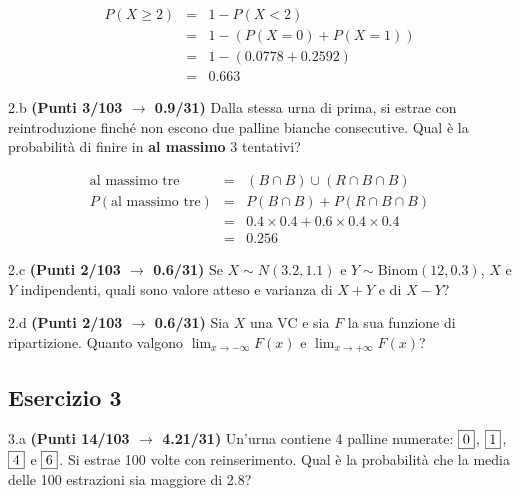 \documentclass[
  11pt,
]{book}
\theoremstyle{mytheoremstyle}
\theoremstyle{mydefstyle}
\newenvironment{sol}
  {
  \begin{tcolorbox}[enhanced,breakable,arc=0.1mm,boxrule=1pt,colback=white,colframe=iblue,
  title=\bf \fontfamily{lmss}\selectfont \hspace{.5 cm} Soluzione,drop fuzzy shadow]

}{
\end{tcolorbox}
  }
\begin{document}
\begin{sol}
\begin{eqnarray*}
  P(X\ge 2) &=&  1-P(X<2)\\
  &=& 1-(P(X=0)+P(X=1))\\
  &=& 1-(0.0778+0.2592)\\
  &=& 0.663
\end{eqnarray*}

\end{sol}

2.b \textbf{(Punti 3/103 \(\rightarrow\) 0.9/31)} Dalla stessa urna di prima, si estrae con reintroduzione finché non escono due palline bianche consecutive. Qual è la probabilità di finire in \textbf{al massimo} 3 tentativi?

\begin{sol}
\begin{eqnarray*}
  \text{al massimo tre} &=& (B\cap B)\cup(R\cap B\cap B )\\
  P(\text{al massimo tre}) &=& P(B\cap B)+P(R\cap B\cap B)\\
  &=&0.4\times 0.4 +0.6\times 0.4\times 0.4\\
  &=& 0.256
\end{eqnarray*}

\end{sol}

2.c \textbf{(Punti 2/103 \(\rightarrow\) 0.6/31)} Se \(X\sim N(3.2,1.1)\) e \(Y\sim\text{Binom}(12,0.3)\), \(X\) e \(Y\) indipendenti, quali sono valore atteso e varianza di \(X+Y\) e di \(X-Y\)?

2.d \textbf{(Punti 2/103 \(\rightarrow\) 0.6/31)} Sia \(X\) una VC e sia \(F\) la sua funzione di ripartizione. Quanto valgono \(\lim_{x\to-\infty}F(x)\) e \(\lim_{x\to+\infty}F(x)\)?

\subsection{Esercizio 3}\label{esercizio-3-21}

3.a \textbf{(Punti 14/103 \(\rightarrow\) 4.21/31)} Un'urna contiene 4 palline numerate: \(\fbox{0}\), \(\fbox{1}\), \(\fbox{4}\) e \(\fbox{6}\). Si estrae 100 volte con reinserimento. Qual è la probabilità che la media delle 100 estrazioni sia maggiore di 2.8?
\end{document}
